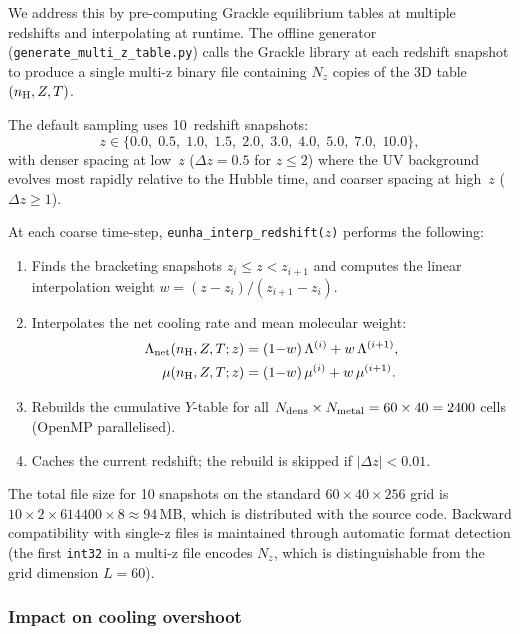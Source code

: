\documentclass[fleqn,usenatbib]{mnras}
\newcommand{\code}[1]{\texttt{#1}}
\begin{document}
We address this by pre-computing Grackle equilibrium tables at multiple
redshifts and interpolating at runtime.  The offline generator
(\code{generate\_multi\_z\_table.py}) calls the Grackle library at
each redshift snapshot to produce a single multi-z binary file
containing $N_z$ copies of the 3D table $(n_{\rm H}, Z, T)$.

The default sampling uses 10~redshift snapshots:
\begin{equation}
  z \in \{0.0,\; 0.5,\; 1.0,\; 1.5,\; 2.0,\; 3.0,\; 4.0,\; 5.0,\;
  7.0,\; 10.0\},
  \label{eq:z_grid}
\end{equation}
with denser spacing at low~$z$ ($\Delta z = 0.5$ for $z \le 2$) where
the UV background evolves most rapidly relative to the Hubble time, and
coarser spacing at high~$z$ ($\Delta z \ge 1$).

At each coarse time-step, \code{eunha\_interp\_redshift($z$)} performs
the following:
\begin{enumerate}
  \item Finds the bracketing snapshots $z_i \le z < z_{i+1}$ and
    computes the linear interpolation weight
    $w = (z - z_i)/(z_{i+1} - z_i)$.
  \item Interpolates the net cooling rate and mean molecular weight:
    \begin{align}
      \Lambda_{\rm net}(n_{\rm H}, Z, T; z)
        &= (1{-}w)\,\Lambda^{(i)} + w\,\Lambda^{(i+1)}, \\
      \mu(n_{\rm H}, Z, T; z)
        &= (1{-}w)\,\mu^{(i)} + w\,\mu^{(i+1)}.
    \end{align}
  \item Rebuilds the cumulative $Y$-table for all
    $N_{\rm dens} \times N_{\rm metal} = 60 \times 40 = 2400$ cells
    (OpenMP parallelised).
  \item Caches the current redshift; the rebuild is skipped if
    $|\Delta z| < 0.01$.
\end{enumerate}

The total file size for 10 snapshots on the standard
$60 \times 40 \times 256$ grid is
$10 \times 2 \times 614400 \times 8 \approx 94\,$MB, which is
distributed with the source code.  Backward compatibility with
single-z files is maintained through automatic format detection
(the first \code{int32} in a multi-z file encodes $N_z$, which is
distinguishable from the grid dimension $L = 60$).

\subsubsection{Impact on cooling overshoot}
\label{sec:multi_z_overshoot}
\end{document}
